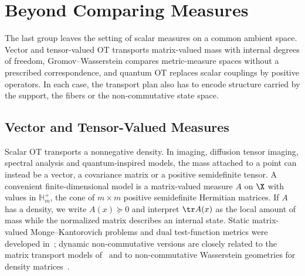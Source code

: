 
\section{Beyond Comparing Measures}
\label{sec-beyond-comparing-measures}

The last group leaves the setting of scalar measures on a common ambient space. Vector and tensor-valued OT transports matrix-valued mass with internal degrees of freedom, Gromov--Wasserstein compares metric-measure spaces without a prescribed correspondence, and quantum OT replaces scalar couplings by positive operators. In each case, the transport plan also has to encode structure carried by the support, the fibers or the non-commutative state space.

\subsection{Vector and Tensor-Valued Measures}
\label{sec-vector-tensor-valued-measures}

Scalar OT transports a nonnegative density. In imaging, diffusion tensor imaging, spectral analysis and quantum-inspired models, the mass attached to a point can instead be a vector, a covariance matrix or a positive semidefinite tensor. A convenient finite-dimensional model is a matrix-valued measure $A$ on $\X$ with values in $\mathbb H_m^+$, the cone of $m\times m$ positive semidefinite Hermitian matrices. If $A$ has a density, we write $A(x)\succeq0$ and interpret $\tr A(x)$ as the local amount of mass while the normalized matrix describes an internal state. Static matrix-valued Monge--Kantorovich problems and dual test-function metrics were developed in~\cite{Ning2014metrics,JiangSpectral,ning2015matrix}; dynamic non-commutative versions are closely related to the matrix transport models of~\cite{Chen2016,ChenGangbo17} and to non-commutative Wasserstein geometries for density matrices~\cite{Carlen2014,2016-peyre-qot}.

